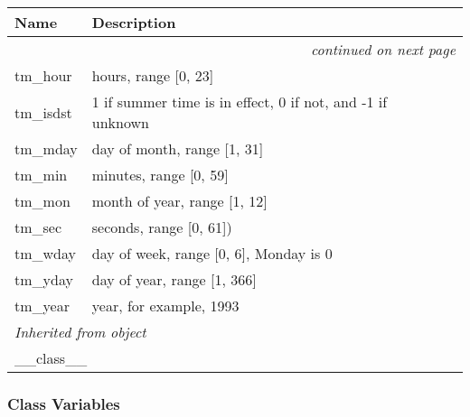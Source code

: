     \vspace{-1cm}
\hspace{\varindent}\begin{longtable}{|p{\varnamewidth}|p{\vardescrwidth}|l}
\cline{1-2}
\cline{1-2} \centering \textbf{Name} & \centering \textbf{Description}& \\
\cline{1-2}
\endhead\cline{1-2}\multicolumn{3}{r}{\small\textit{continued on next page}}\\\endfoot\cline{1-2}
\endlastfoot\raggedright t\-m\-\_\-h\-o\-u\-r\- & \raggedright hours, range [0, 23]&\\
\cline{1-2}
\raggedright t\-m\-\_\-i\-s\-d\-s\-t\- & \raggedright 1 if summer time is in effect, 0 if not, and -1 if unknown&\\
\cline{1-2}
\raggedright t\-m\-\_\-m\-d\-a\-y\- & \raggedright day of month, range [1, 31]&\\
\cline{1-2}
\raggedright t\-m\-\_\-m\-i\-n\- & \raggedright minutes, range [0, 59]&\\
\cline{1-2}
\raggedright t\-m\-\_\-m\-o\-n\- & \raggedright month of year, range [1, 12]&\\
\cline{1-2}
\raggedright t\-m\-\_\-s\-e\-c\- & \raggedright seconds, range [0, 61])&\\
\cline{1-2}
\raggedright t\-m\-\_\-w\-d\-a\-y\- & \raggedright day of week, range [0, 6], Monday is 0&\\
\cline{1-2}
\raggedright t\-m\-\_\-y\-d\-a\-y\- & \raggedright day of year, range [1, 366]&\\
\cline{1-2}
\raggedright t\-m\-\_\-y\-e\-a\-r\- & \raggedright year, for example, 1993&\\
\cline{1-2}
\multicolumn{2}{|l|}{\textit{Inherited from object}}\\
\multicolumn{2}{|p{\varwidth}|}{\raggedright \_\_class\_\_}\\
\cline{1-2}
\end{longtable}



  \subsubsection{Class Variables}

